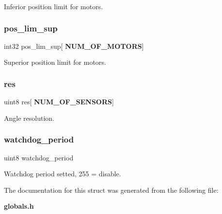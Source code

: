 Inferior position limit for motors. \mbox{\label{structst__mem_a818808d7c324999701b5aad40a8fabca}} 
\subsubsection{pos\+\_\+lim\+\_\+sup}
{\footnotesize\ttfamily int32 pos\+\_\+lim\+\_\+sup[\textbf{ N\+U\+M\+\_\+\+O\+F\+\_\+\+M\+O\+T\+O\+RS}]}

Superior position limit for motors. \mbox{\label{structst__mem_ac2e19d167eac4c8ca9ce97c646e78595}} 
\subsubsection{res}
{\footnotesize\ttfamily uint8 res[\textbf{ N\+U\+M\+\_\+\+O\+F\+\_\+\+S\+E\+N\+S\+O\+RS}]}

Angle resolution. \mbox{\label{structst__mem_a1aae70aad54a04c7b41a8d2dcd7aba14}} 
\subsubsection{watchdog\+\_\+period}
{\footnotesize\ttfamily uint8 watchdog\+\_\+period}

Watchdog period setted, 255 = disable. 

The documentation for this struct was generated from the following file\+:\begin{DoxyCompactItemize}
\item 
\textbf{ globals.\+h}\end{DoxyCompactItemize}
